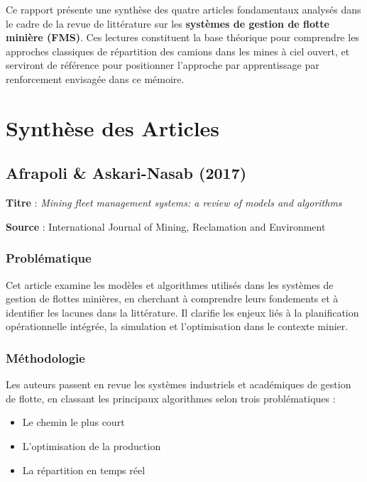 \documentclass[12pt,a4paper]{article}
\begin{document}
Ce rapport présente une synthèse des quatre articles fondamentaux analysés dans le cadre de la revue de littérature sur les \textbf{systèmes de gestion de flotte minière (FMS)}. Ces lectures constituent la base théorique pour comprendre les approches classiques de répartition des camions dans les mines à ciel ouvert, et serviront de référence pour positionner l'approche par apprentissage par renforcement envisagée dans ce mémoire.

\section{Synthèse des Articles}

\subsection{Afrapoli \& Askari-Nasab (2017)}

\textbf{Titre} : \textit{Mining fleet management systems: a review of models and algorithms}

\textbf{Source} : International Journal of Mining, Reclamation and Environment

\subsubsection{Problématique}

Cet article examine les modèles et algorithmes utilisés dans les systèmes de gestion de flottes minières, en cherchant à comprendre leurs fondements et à identifier les lacunes dans la littérature. Il clarifie les enjeux liés à la planification opérationnelle intégrée, la simulation et l'optimisation dans le contexte minier.

\subsubsection{Méthodologie}

Les auteurs passent en revue les systèmes industriels et académiques de gestion de flotte, en classant les principaux algorithmes selon trois problématiques :
\begin{itemize}
    \item Le chemin le plus court
    \item L'optimisation de la production
    \item La répartition en temps réel
\end{itemize}
\end{document}
